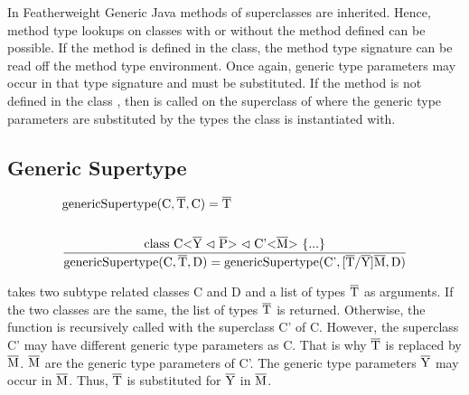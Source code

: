 In Featherweight Generic Java methods of superclasses are inherited. Hence, method type lookups on classes with or without the method defined can be possible. If the method is defined in the class, the method type signature can be read off the method type environment. Once again, generic type parameters may occur in that type signature and must be substituted.
If the method is not defined in the class , then  is called on the superclass of  where the generic type parameters are substituted by the types the class  is instantiated with.

\subsection{Generic Supertype}

\begin{align*}
    &\text{genericSupertype} (\text{C}, \overline{\text{T}}, \text{C} ) = \overline{\text{T}}\\
    \\
    &\frac{ \text{class} \ \text{C} \text{<} \overline{\text{Y}} \vartriangleleft \overline{\text{P}} \text{>} \vartriangleleft \text{C'<}\overline{\text{M}}\text{>} \ \{ ... \} }{ \text{genericSupertype} ( \text{C}, \overline{\text{T}}, \text{D} ) = \text{genericSupertype} ( \text{C'}, \text{[}\overline{\text{T}}/\overline{\text{Y}}\text{]}\overline{\text{M}}, \text{D} ) }\\
\end{align*}

 takes two subtype related classes C and D and a list of types $\overline{\text{T}}$ as arguments. If the two classes are the same, the list of types $\overline{\text{T}}$ is returned. Otherwise, the function is recursively called with the superclass C' of C.
However, the superclass C' may have different generic type parameters as C. That is why $\overline{\text{T}}$ is replaced by $\overline{\text{M}}$. $\overline{\text{M}}$ are the generic type parameters of C'. The generic type parameters $\overline{\text{Y}}$ may occur in $\overline{\text{M}}$. Thus, $\overline{\text{T}}$ is substituted for $\overline{\text{Y}}$ in $\overline{\text{M}}$.
